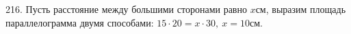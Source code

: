 216. Пусть расстояние между большими сторонами равно $x$см, выразим площадь параллелограмма двумя способами: $15\cdot20=x\cdot30,\ x=10$см.\\
